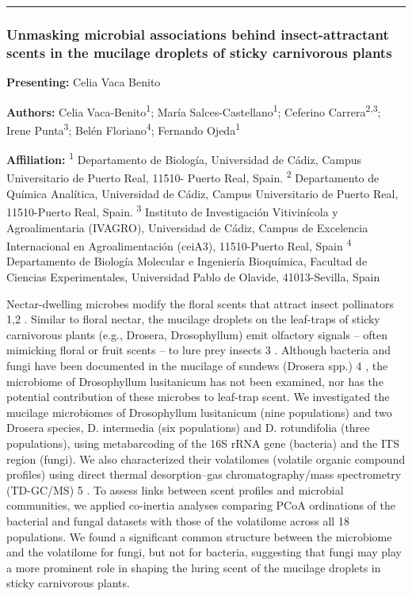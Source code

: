 \documentclass[
  letterpaper,
  DIV=11,
  numbers=noendperiod]{scrartcl}
\begin{document}
\begin{center}\rule{0.5\linewidth}{0.5pt}\end{center}

\subsubsection{Unmasking microbial associations behind insect-attractant
scents in the mucilage droplets of sticky carnivorous
plants}\label{unmasking-microbial-associations-behind-insect-attractant-scents-in-the-mucilage-droplets-of-sticky-carnivorous-plants}

\textbf{Presenting:} Celia Vaca Benito

\textbf{Authors:} Celia Vaca-Benito\textsuperscript{1}; María
Salces-Castellano\textsuperscript{1}; Ceferino
Carrera\textsuperscript{2,3}; Irene Punta\textsuperscript{3}; Belén
Floriano\textsuperscript{4}; Fernando Ojeda\textsuperscript{1}

\textbf{Affiliation:} \textsuperscript{1} Departamento de Biología,
Universidad de Cádiz, Campus Universitario de Puerto Real, 11510- Puerto
Real, Spain. \textsuperscript{2} Departamento de Química Analítica,
Universidad de Cádiz, Campus Universitario de Puerto Real, 11510-Puerto
Real, Spain. \textsuperscript{3} Instituto de Investigación Vitivinícola
y Agroalimentaria (IVAGRO), Universidad de Cádiz, Campus de Excelencia
Internacional en Agroalimentación (ceiA3), 11510-Puerto Real, Spain
\textsuperscript{4} Departamento de Biología Molecular e Ingeniería
Bioquímica, Facultad de Ciencias Experimentales, Universidad Pablo de
Olavide, 41013-Sevilla, Spain

Nectar-dwelling microbes modify the floral scents that attract insect
pollinators 1,2 . Similar to floral nectar, the mucilage droplets on the
leaf-traps of sticky carnivorous plants (e.g., Drosera, Drosophyllum)
emit olfactory signals -- often mimicking floral or fruit scents -- to
lure prey insects 3 . Although bacteria and fungi have been documented
in the mucilage of sundews (Drosera spp.) 4 , the microbiome of
Drosophyllum lusitanicum has not been examined, nor has the potential
contribution of these microbes to leaf-trap scent. We investigated the
mucilage microbiomes of Drosophyllum lusitanicum (nine populations) and
two Drosera species, D. intermedia (six populations) and D. rotundifolia
(three populations), using metabarcoding of the 16S rRNA gene (bacteria)
and the ITS region (fungi). We also characterized their volatilomes
(volatile organic compound profiles) using direct thermal
desorption--gas chromatography/mass spectrometry (TD-GC/MS) 5 . To
assess links between scent profiles and microbial communities, we
applied co-inertia analyses comparing PCoA ordinations of the bacterial
and fungal datasets with those of the volatilome across all 18
populations. We found a significant common structure between the
microbiome and the volatilome for fungi, but not for bacteria,
suggesting that fungi may play a more prominent role in shaping the
luring scent of the mucilage droplets in sticky carnivorous plants.
\end{document}
